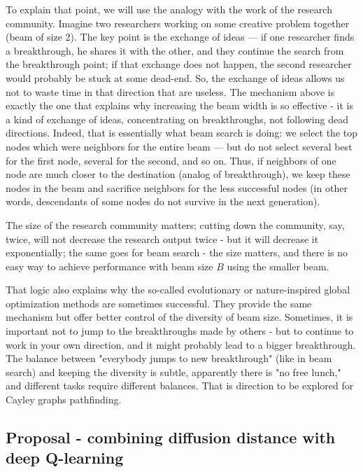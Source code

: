 \documentclass[atmp]{ipart_v1}
\numberwithin{equation}{section}
\theoremstyle{plain}%
\begin{document}
To explain that point, we will use the analogy with the work of the research community.
Imagine two researchers working on some creative problem together (beam of size 2). The key point is the exchange of ideas --- if one researcher finds a breakthrough, he shares it with the other, and they continue the search from the breakthrough point; if that exchange does not happen, the second researcher would probably be stuck at some dead-end. So, the exchange of ideas allows us not to waste time in that direction that are useless. 
The mechanism above is exactly the one that explains why increasing the beam width is so effective - it is a kind of exchange of ideas, concentrating on breakthroughs, not following dead directions. Indeed, that is essentially what beam search is doing: we select the top nodes which were neighbors for the entire beam --- but do not select several best for the first node, several for the second, and so on. Thus, if neighbors of one node are much closer to the destination (analog of breakthrough), we keep these nodes in the beam and sacrifice neighbors for the less successful nodes (in other words, descendants of some nodes do not survive in the next generation).

The size of the research community matters; cutting down the community, say, twice, will not decrease the research output twice - but it will decrease it exponentially; the same goes for beam search - the size matters, and there is no easy way to achieve performance with beam size $B$ using the smaller beam.

That logic also explains why the so-called evolutionary or nature-inspired global optimization methods are sometimes successful. They provide the same mechanism but offer better control of the diversity of beam size. Sometimes, it is important not to jump to the breakthroughs made by others - but to continue to work in your own direction, and it might probably lead to a bigger breakthrough. The balance between "everybody jumps to new breakthrough" (like in beam search) and keeping the diversity is subtle, apparently there is "no free lunch," and different tasks require different balances. That is direction to be explored for Cayley graphs pathfinding. 



\subsection{Proposal -  combining diffusion distance with deep Q-learning}
\end{document}
